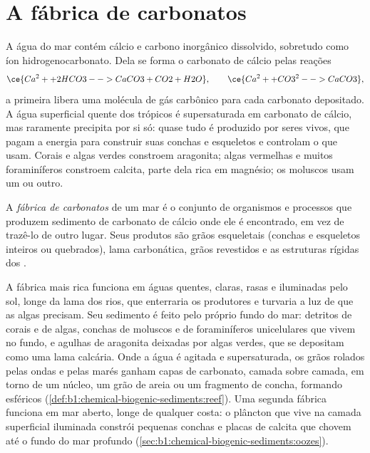\section{A fábrica de carbonatos}\label{sec:b1:chemical-biogenic-sediments:factory}

A água do mar contém cálcio e carbono inorgânico dissolvido, sobretudo como íon
hidrogenocarbonato. Dela se forma o carbonato de cálcio pelas reações
\[
\ce{Ca^2+ + 2 HCO3- -> CaCO3 + CO2 + H2O}, \qquad
\ce{Ca^2+ + CO3^2- -> CaCO3},
\]
a primeira libera uma molécula de gás carbônico para cada carbonato depositado. A água
superficial quente dos trópicos é supersaturada em carbonato de cálcio, mas raramente
precipita por si só: quase tudo é produzido por seres vivos, que pagam a energia para
construir suas conchas e esqueletos e controlam o  que usam. Corais e algas verdes
constroem aragonita; algas vermelhas e muitos foraminíferos constroem calcita, parte dela
rica em magnésio; os moluscos usam um ou outro.

\begin{definition}\label{def:b1:chemical-biogenic-sediments:factory}
A \emph{fábrica de carbonatos} de um mar é o conjunto de
organismos e processos que produzem sedimento de carbonato de cálcio onde ele é
encontrado, em vez de trazê-lo de outro lugar. Seus produtos são grãos esqueletais
(conchas e esqueletos inteiros ou quebrados), lama carbonática, grãos revestidos e as
estruturas rígidas dos .
\end{definition}

A fábrica mais rica funciona em águas quentes, claras, rasas e iluminadas pelo sol,
longe da lama dos rios, que enterraria os produtores e turvaria a luz de que as algas
precisam. Seu sedimento é feito pelo próprio fundo do mar: detritos de corais e de
algas, conchas de moluscos e de foraminíferos unicelulares que vivem no fundo, e agulhas
de aragonita deixadas por algas verdes, que se depositam como uma lama calcária. Onde a
água é agitada e supersaturada, os grãos rolados pelas ondas e pelas marés ganham capas
de carbonato, camada sobre camada, em torno de um núcleo, um grão de areia ou um
fragmento de concha, formando  esféricos
(\cref{def:b1:chemical-biogenic-sediments:reef}). Uma segunda fábrica funciona em mar
aberto, longe de qualquer costa: o plâncton que vive na camada superficial iluminada
constrói pequenas conchas e placas de calcita que chovem até o fundo do mar profundo
(\cref{sec:b1:chemical-biogenic-sediments:oozes}).

